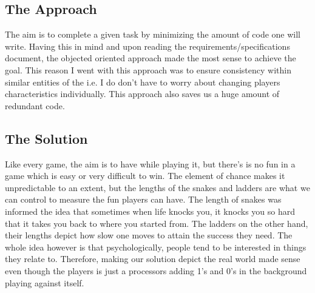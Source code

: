 \subsection*{The Approach}
The aim is to complete a given task by minimizing the amount of code one will write. Having this in mind and upon reading the requirements/specifications document, the objected oriented approach made the most sense to achieve the goal. This reason I went with this approach was to ensure consistency within similar entities of the i.e. I do don't have to worry about changing players characteristics individually. This approach also saves us a huge amount of redundant code.
\subsection*{The Solution}
Like every game, the aim is to have while playing it, but there's is no fun in a game which is easy or very difficult to win. The element of chance makes it unpredictable to an extent, but the lengths of the snakes and ladders are what we can control to measure the fun players can have. The length of snakes was informed the idea that sometimes when life knocks you, it knocks you so hard that it takes you back to where you started from. The ladders on the other hand, their lengths depict how slow one moves to attain the success they need. The whole idea however is that psychologically, people tend to be interested in things they relate to. Therefore, making our solution depict the real world made sense even though the players is just a processors adding 1's and 0's in the background playing against itself.

